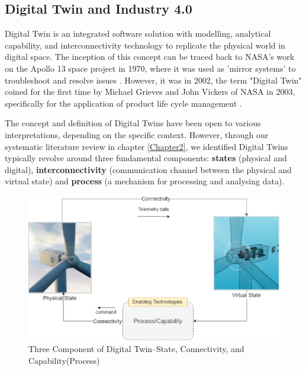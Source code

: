 

\subsection{Digital Twin and Industry 4.0}
Digital Twin is an integrated software solution with modelling, analytical capability, and interconnectivity technology to replicate the physical world in digital space. The inception of this concept can be traced back to NASA's work on the Apollo 13 space project in 1970, where it was used as 'mirror systems' to troubleshoot and resolve issues \cite{adrienbacueDigitalTwinsEnhanced2022}. However, it was in 2002, the term "Digital Twin" coined for the first time by Michael Grieves and John Vickers of NASA in 2003, specifically for the application of product life cycle management \cite{jones_characterising_2020}.

The concept and definition of Digital Twins have been open to various interpretations, depending on the specific context.  However, through our systematic literature review in chapter \ref{Chapter2}, we identified Digital Twins typically revolve around three fundamental components: \textbf{states} (physical and digital), \textbf{interconnectivity} (communication channel between the physical and virtual state) and \textbf{process} (a mechanism for processing and analysing data). 

\begin{figure}[H]
    \centering
    \includegraphics[width=1\linewidth]{images/fp/digital-twin-concept.drawio.png}
    \caption{Three Component of Digital Twin--State, Connectivity, and Capability(Process)}
    \label{fig:dt-concept}
\end{figure}


